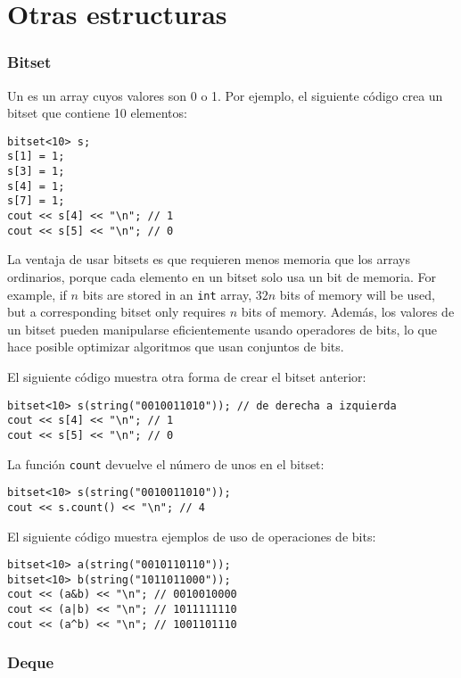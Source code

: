 \section{Otras estructuras}

\subsubsection{Bitset}


Un  es un array
cuyos valores son 0 o 1.
Por ejemplo, el siguiente código crea
un bitset que contiene 10 elementos:
\begin{lstlisting}
bitset<10> s;
s[1] = 1;
s[3] = 1;
s[4] = 1;
s[7] = 1;
cout << s[4] << "\n"; // 1
cout << s[5] << "\n"; // 0
\end{lstlisting}

La ventaja de usar bitsets es que
requieren menos memoria que los arrays ordinarios,
porque cada elemento en un bitset solo
usa un bit de memoria.
For example, 
if $n$ bits are stored in an \texttt{int} array,
$32n$ bits of memory will be used,
but a corresponding bitset only requires $n$ bits of memory.
Además, los valores de un bitset
pueden manipularse eficientemente usando
operadores de bits, lo que hace posible
optimizar algoritmos que usan conjuntos de bits.

El siguiente código muestra otra forma de crear el bitset anterior:
\begin{lstlisting}
bitset<10> s(string("0010011010")); // de derecha a izquierda
cout << s[4] << "\n"; // 1
cout << s[5] << "\n"; // 0
\end{lstlisting}

La función \texttt{count} devuelve el número
de unos en el bitset:

\begin{lstlisting}
bitset<10> s(string("0010011010"));
cout << s.count() << "\n"; // 4
\end{lstlisting}

El siguiente código muestra ejemplos de uso de operaciones de bits:
\begin{lstlisting}
bitset<10> a(string("0010110110"));
bitset<10> b(string("1011011000"));
cout << (a&b) << "\n"; // 0010010000
cout << (a|b) << "\n"; // 1011111110
cout << (a^b) << "\n"; // 1001101110
\end{lstlisting}

\subsubsection{Deque}

